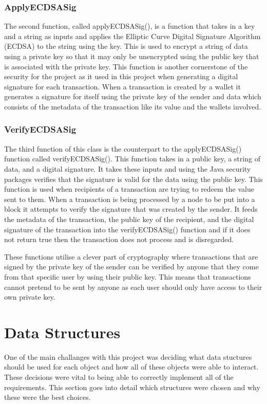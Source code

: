 \documentclass{l4proj}
\begin{document}
\subsubsection{ApplyECDSASig}
The second function, called applyECDSASig(), is a function that takes in a key and a string as inputs and
applies the Elliptic Curve Digital Signature Algorithm (ECDSA) to the string using the key. This is used to encrypt a string
of data using a private key so that it may only be unencrypted using the public key that is associated with the private
key. This function is another cornerstone of the security for the project as it used in this project when generating
a digital signature for each transaction. When a transaction is created by a wallet it generates a signature for
itself using the private key of the sender and data which consists of the metadata of the transaction like its value
and the wallets involved. 

\subsubsection{VerifyECDSASig}
The third function of this class is the counterpart to the applyECDSASig() function called verifyECDSASig(). This 
function takes in a public key, a string of data, and a digital signature. It takes these inputs and using the Java
security packages verifies that the signature is valid for the data using the public key. This function is used
when recipients of a transaction are trying to redeem the value sent to them. When a transaction is being processed
by a node to be put into a block it attempts to verify the signature that was created by the sender. It feeds the metadata
of the transaction, the public key of the recipient, and the digital signature of the transaction into the verifyECDSASig()
function and if it does not return true then the transaction does not process and is disregarded.

These functions utilise a clever part of cryptography where transactions that are signed by the private key of the
sender can be verified by anyone that they come from that specific user by using their public key. This means that 
transactions cannot pretend to be sent by anyone as each user should only have access to their own private key.

\section{Data Structures}
One of the main challanges with this project was deciding what data stuctures should be used for each object and
how all of these objects were able to interact. These decisions were vital to being able to correctly implement
all of the requirements. This section goes into detail which structures were chosen and why these were the best
choices.
\end{document}
